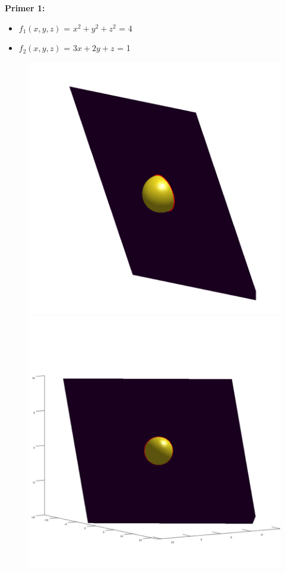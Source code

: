\documentclass[12pt]{article}
\begin{document}
	\begin{minipage}{\textwidth}
		\textbf{\large{Primer 1:}}
		\begin{itemize} 
			\item $f_{1}(x,y,z)$ = $x^2 + y^2 + z^2$ = 4
			\item $f_{2}(x,y,z)$ = $3x + 2y + z$ = 1	
		\end{itemize}
		\begin{figure}[H]
			\centering
			\includegraphics[scale=0.3]{primer1_1}
			\includegraphics[scale=0.3]{primer1_2}
		\end{figure}
	\end{minipage}
	
\end{document}

